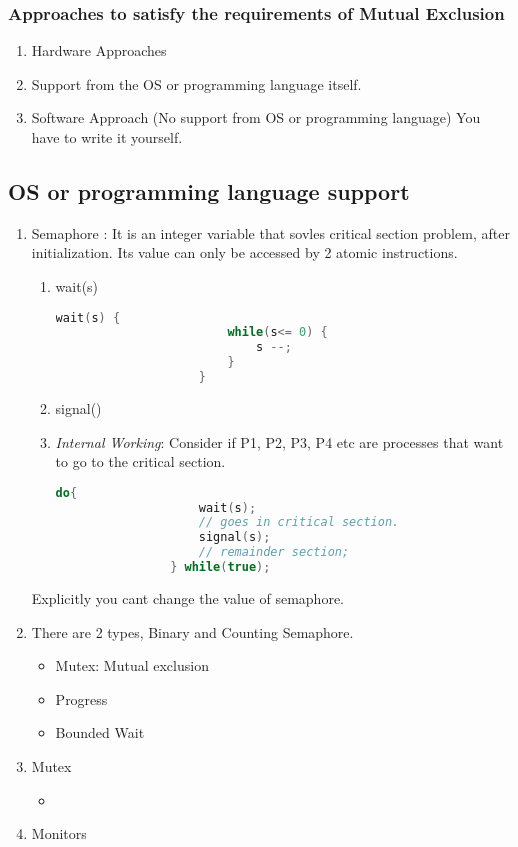 \documentclass[11pt]{article}
\begin{document}
\subsubsection{Approaches to satisfy the requirements of Mutual Exclusion}
\begin{enumerate}
	\item Hardware Approaches
	\item Support from the OS or programming language itself.
	\item Software Approach (No support from OS or programming language) You have to write it yourself.
\end{enumerate}

\subsection{OS or programming language support}
\begin{enumerate}
	\item Semaphore : It is an integer variable that sovles critical section problem, after initialization. Its value can only be accessed by 2 atomic instructions.
	      \begin{enumerate}
		      \item wait(s)
		            \begin{lstlisting}[language = C]
					wait(s) {
						while(s<= 0) {
							s --;
						}
					}
					\end{lstlisting}

		      \item signal()
		      \item \textit{Internal Working}: Consider if P1, P2, P3, P4 etc are processes that want to go to the critical section.
		            \begin{lstlisting}[language = C++]
				do{
					wait(s);
					// goes in critical section. 
					signal(s);
					// remainder section;
				} while(true);
			  \end{lstlisting}
	      \end{enumerate}
	      Explicitly you cant change the value of semaphore.
	\item There are 2 types, Binary and Counting Semaphore.
	      \begin{itemize}
		      \item Mutex: Mutual exclusion
		      \item Progress
		      \item Bounded Wait
	      \end{itemize}
	\item Mutex
	      \begin{itemize}
		      \item
	      \end{itemize}
	\item Monitors
\end{enumerate}
\end{document}
